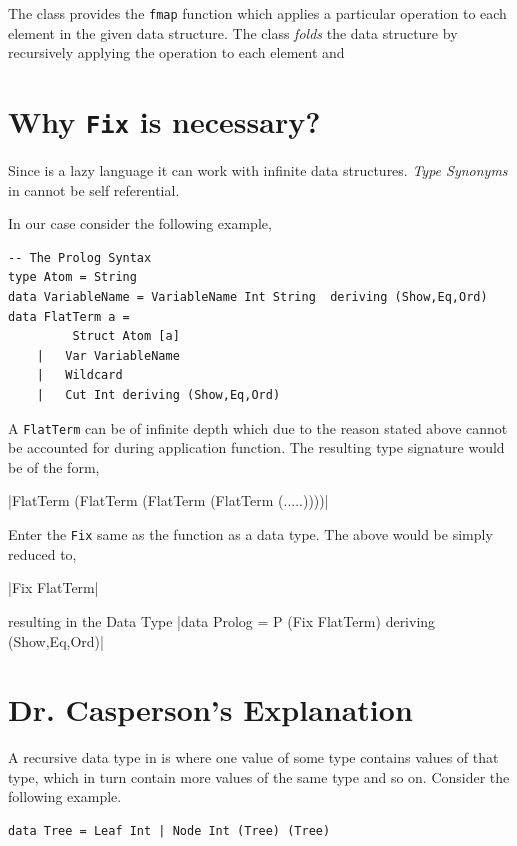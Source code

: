 \documentclass[thesis-solanki.tex]{subfiles}
\begin{document}
The  class provides the \texttt{fmap} function which applies a particular operation to each element in the given data structure. The  class \textit{folds} the data structure by recursively applying the operation to each element and

\section{Why \texttt{Fix} is necessary?}
Since  is a lazy language it can work with infinite data structures. \textit{Type Synonyms} in  cannot be self 
referential.


 

In our case consider the following example,

\begin{verbatim}
-- The Prolog Syntax
type Atom = String
data VariableName = VariableName Int String  deriving (Show,Eq,Ord)
data FlatTerm a = 
		 Struct Atom [a]
	|	Var VariableName
	|	Wildcard
	|	Cut Int deriving (Show,Eq,Ord)
\end{verbatim} 
 
A \texttt{FlatTerm} can be of infinite depth which due to the reason stated above cannot be accounted for during application function. The resulting type signature would be of the form,

|FlatTerm (FlatTerm (FlatTerm (FlatTerm (.....))))|

Enter the \texttt{Fix} same as the function as a data type. The above would be simply reduced to,

|Fix FlatTerm|   

resulting in the  Data Type
|data Prolog = P (Fix FlatTerm) deriving (Show,Eq,Ord)|

\section{Dr. Casperson's Explanation}

A recursive data type in  is where one value of some type contains values of that type, which in turn contain more values of the same type 
and so on. Consider the following example.

\begin{verbatim}
data Tree = Leaf Int | Node Int (Tree) (Tree)
\end{verbatim} 
\end{document}
